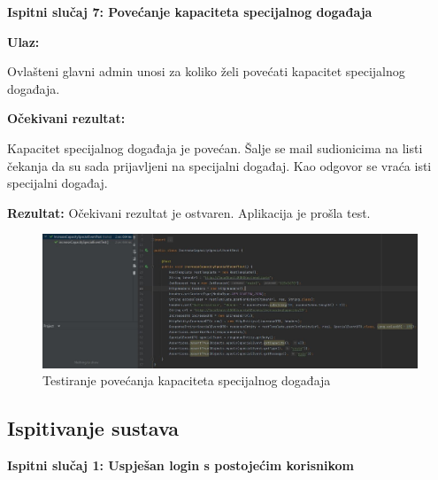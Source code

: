    
   
   			\textbf{Ispitni slučaj 7: Povećanje kapaciteta specijalnog događaja \newline}
   
   \textbf{Ulaz:}
   \begin{packed_item}
   \item[] \begin{packed_enum}
				
				\item Ovlašteni glavni admin unosi za koliko želi povećati kapacitet specijalnog događaja.
				
			\end{packed_enum}
   \end{packed_item}

   \textbf{Očekivani rezultat:}
   \begin{packed_item}
   \item[] \begin{packed_enum}
				
				\item Kapacitet specijalnog događaja je povećan. Šalje se mail sudionicima na listi čekanja da su sada prijavljeni na specijalni događaj. Kao odgovor se vraća isti specijalni događaj.
				
			\end{packed_enum}
   \end{packed_item}
   \textbf{Rezultat:} \text Očekivani rezultat je ostvaren. \color{red} Aplikacija je prošla test. \color{black}

    \begin{figure}[H]
            \includegraphics[scale=0.45]{slike/IncreaseCapacitySpecialEvent.JPG} %
			
			\centering
			\caption{Testiranje povećanja kapaciteta specijalnog događaja}
			\label{fig:testiranje povećanja kapaciteta specijalnog događaja}
			\end{figure}

			
			\subsection{Ispitivanje sustava}
		\textbf{Ispitni slučaj 1: Uspješan login s postojećim korisnikom\newline}

